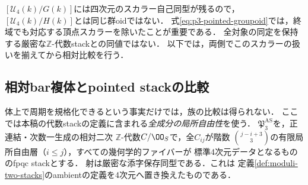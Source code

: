 \begin{remark}[スカラー商のlevel]
$[\mathcal U_4(k)/G(k)]$には四次元のスカラー自己同型が残るので，
$[\mathcal U_4(k)/H(k)]$とは同じ群oidではない．
式\eqref{eq:p3-pointed-groupoid}では，終域でも対応する頂点スカラーを除いたことが重要である．
全対象の同定を保持する厳密な$\mathbb Z$-代数stackとの同値ではない．
以下では，両側でこのスカラーの扱いを揃えてから相対比較を行う．
\end{remark}

\subsection{相対bar複体とpointed stackの比較}

体上で周期を規格化できるという事実だけでは，族の比較は得られない．
ここでは本稿の代数stackの定義に含まれる\emph{全成分の局所自由性}を使う．
$\mathfrak P_3^{\mathrm{AS}}$を，正連結・次数一生成の相対二次
$\mathbb Z$-代数$C/\OO_S$で，全$C_{ij}$が階数
$\binom{j-i+3}{3}$の有限局所自由層（$i\le j$），すべての幾何学的ファイバーが
標準4次元データとなるもののfpqc stackとする．
射は厳密な添字保存同型である．これは
定義\ref{def:moduli-two-stacks}のambientの定義を4次元へ置き換えたものである．

